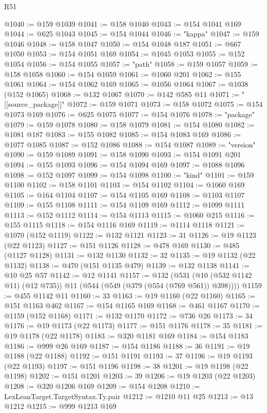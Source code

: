 \begin{lexlean}{R51}
\begin{coremodule}
@1040 := @159 @1039
@1041 := @158 @1040
@1043 := @154 @1041 @169
@1044 := @625 @1043
@1045 := @154 @1044
@1046 := "kappa"
@1047 := @159 @1046
@1048 := @158 @1047
@1050 := @154 @1048 @187
@1051 := @667 @1050
@1053 := @154 @1051 @169
@1054 := @1045 @1053
@1055 := @152 @1054
@1056 := @154 @1055
@1057 := "path"
@1058 := @159 @1057
@1059 := @158 @1058
@1060 := @154 @1059
@1061 := @1060 @201
@1062 := @155 @1061
@1064 := @154 @1062 @169
@1065 := @1056 @1064
@1067 := @1038 (@152 @1065)
@1068 := @132 @1067
@1070 := @142 @585 @11
@1071 := "[[source_package]]"
@1072 := @159 @1071
@1073 := @158 @1072
@1075 := @154 @1073 @169
@1076 := @625 @1075
@1077 := @154 @1076
@1078 := "package"
@1079 := @159 @1078
@1080 := @158 @1079
@1081 := @154 @1080
@1082 := @1081 @187
@1083 := @155 @1082
@1085 := @154 @1083 @169
@1086 := @1077 @1085
@1087 := @152 @1086
@1088 := @154 @1087
@1089 := "version"
@1090 := @159 @1089
@1091 := @158 @1090
@1093 := @154 @1091 @201
@1094 := @155 @1093
@1096 := @154 @1094 @169
@1097 := @1088 @1096
@1098 := @152 @1097
@1099 := @154 @1098
@1100 := "kind"
@1101 := @159 @1100
@1102 := @158 @1101
@1103 := @154 @1102
@1104 := @1060 @169
@1105 := @164 @1104
@1107 := @154 @1105 @169
@1108 := @1103 @1107
@1109 := @155 @1108
@1111 := @154 @1109 @169
@1112 := @1099 @1111
@1113 := @152 @1112
@1114 := @154 @1113
@1115 := @1060 @215
@1116 := @155 @1115
@1118 := @154 @1116 @169
@1119 := @1114 @1118
@1121 := @1070 (@152 @1119)
@1122 := @132 @1121
@1123 := 31
@1126 := @19 @1123 (@22 @1123)
@1127 := @151 @1126
@1128 := @478 @169
@1130 := @485 (@1127 @1128)
@1131 := @132 @1130
@1132 := 32
@1135 := @19 @1132 (@22 @1132)
@1138 := @470 (@151 @1135 @479)
@1139 := @132 @1138
@1141 := @10 @25 @57
@1142 := @12 @1141
@1157 := @132
    (@531 (@10 (@532 @1142 @11) (@12 @735)) @11 (@544 (@549 (@379 (@554 (@769 @561)) @398))))
@1159 := @455 @1142 @11
@1160 := 33
@1163 := @19 @1160 (@22 @1160)
@1165 := @151 @1163 @462
@1167 := @154 @1165 @169
@1168 := @461 @1167
@1170 := @1159 (@152 @1168)
@1171 := @132 @1170
@1172 := @736 @26
@1173 := 34
@1176 := @19 @1173 (@22 @1173)
@1177 := @151 @1176
@1178 := 35
@1181 := @19 @1178 (@22 @1178)
@1183 := @320 @1181 @169
@1184 := @154 @1183
@1186 := @999 @26 @169
@1187 := @154 @1186
@1188 := 36
@1191 := @19 @1188 (@22 @1188)
@1192 := @151 @1191
@1193 := 37
@1196 := @19 @1193 (@22 @1193)
@1197 := @151 @1196
@1198 := 38
@1201 := @19 @1198 (@22 @1198)
@1202 := @151 @1201
@1203 := 39
@1206 := @19 @1203 (@22 @1203)
@1208 := @320 @1206 @169
@1209 := @154 @1208
@1210 := LexLeanTarget.TargetSyntax.Ty.pair
@1212 := @1210 @11 @25
@1213 := @13 @1212
@1215 := @999 @1213 @169

\end{coremodule}
\end{lexlean}
